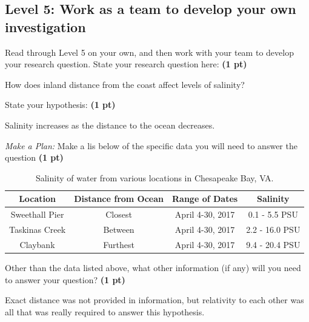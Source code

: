 \documentclass[12pt,letterpaper]{article}
\begin{document}
\subsection*{Level 5: Work as a team to develop your own investigation}
\begin{enumerate}[font=\bfseries, wide, resume]
    {\color{under}\item Read through Level 5 on your own, and then work with your team to develop your research question. State your research question here: \textbf{(1 pt)}}

    How does inland distance from the coast affect levels of salinity?

    {\color{under}\item State your hypothesis: \textbf{(1 pt)}}

    Salinity increases as the distance to the ocean decreases.

    {\color{under}\item \textit{Make a Plan:} Make a lis below of the specific data you will need to answer the question \textbf{(1 pt)} }

    \begin{table}[h]
        \centering
        \caption{Salinity of water from various locations in Chesapeake Bay, VA.}
        \begin{tabular}{cccc}
            \toprule
             Location & Distance from Ocean & Range of Dates & Salinity  \\
            \midrule
            Sweethall Pier & Closest & April 4-30, 2017 & 0.1 - 5.5 PSU \\
            Taskinas Creek & Between &April 4-30, 2017 & 2.2 - 16.0 PSU \\
            Claybank & Furthest &April 4-30, 2017 & 9.4 - 20.4 PSU \\
            \bottomrule
            \end{tabular}
    \end{table}
    
    {\color{under}\item Other than the data listed above, what other information (if any) will you need to answer your question? \textbf{(1 pt)}}

    Exact distance was not provided in information, but relativity to each other was all that was really required to answer this hypothesis. 


\end{enumerate}
\end{document}
